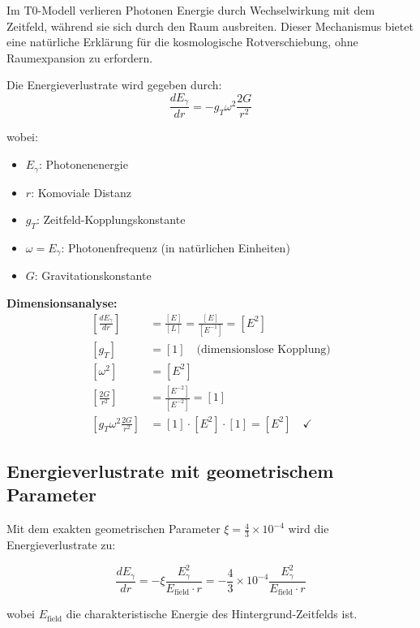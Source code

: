 \documentclass[12pt,a4paper]{report}
\begin{document}
	Im T0-Modell verlieren Photonen Energie durch Wechselwirkung mit dem Zeitfeld, während sie sich durch den Raum ausbreiten. Dieser Mechanismus bietet eine natürliche Erklärung für die kosmologische Rotverschiebung, ohne Raumexpansion zu erfordern.
	
	Die Energieverlustrate wird gegeben durch:
	\begin{equation}
		\frac{dE_\gamma}{dr} = -g_T \omega^2 \frac{2G}{r^2}
		\label{eq:photon_energy_loss}
	\end{equation}
	
	wobei:
	\begin{itemize}
		\item $E_\gamma$: Photonenenergie
		\item $r$: Komoviale Distanz
		\item $g_T$: Zeitfeld-Kopplungskonstante
		\item $\omega = E_\gamma$: Photonenfrequenz (in natürlichen Einheiten)
		\item $G$: Gravitationskonstante
	\end{itemize}
	
	\textbf{Dimensionsanalyse:}
	\begin{align}
		\left[\frac{dE_\gamma}{dr}\right] &= \frac{[E]}{[L]} = \frac{[E]}{[E^{-1}]} = [E^2] \\
		[g_T] &= [1] \quad \text{(dimensionslose Kopplung)} \\
		[\omega^2] &= [E^2] \\
		\left[\frac{2G}{r^2}\right] &= \frac{[E^{-2}]}{[E^{-2}]} = [1] \\
		\left[g_T \omega^2 \frac{2G}{r^2}\right] &= [1] \cdot [E^2] \cdot [1] = [E^2] \quad \checkmark
	\end{align}
	
\subsection{Energieverlustrate mit geometrischem Parameter}
\label{subsec:corrected_energy_loss_rate}

Mit dem exakten geometrischen Parameter $\xi = \frac{4}{3} \times 10^{-4}$ wird die Energieverlustrate zu:

\begin{equation}
	\boxed{\frac{dE_\gamma}{dr} = -\xi \frac{E_\gamma^2}{E_{\text{field}} \cdot r} = -\frac{4}{3} \times 10^{-4} \frac{E_\gamma^2}{E_{\text{field}} \cdot r}}
\end{equation}

wobei $E_{\text{field}}$ die charakteristische Energie des Hintergrund-Zeitfelds ist.
\end{document}
